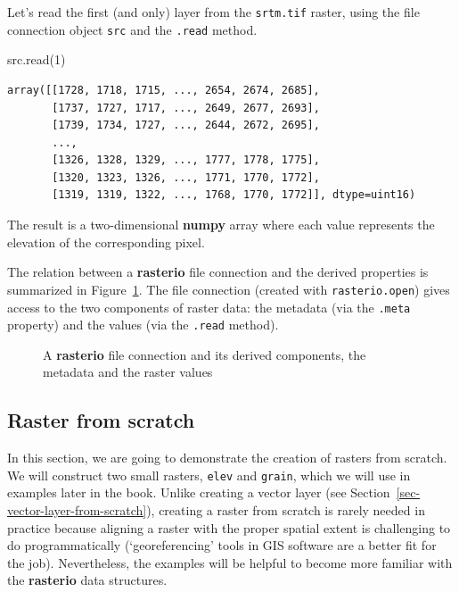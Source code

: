 \documentclass[
  letterpaper,
]{krantz}
\newenvironment{Shaded}{\begin{snugshade}}{\end{snugshade}}
\newcommand{\DecValTok}[1]{\textcolor[rgb]{0.68,0.00,0.00}{#1}}
\newcommand{\NormalTok}[1]{\textcolor[rgb]{0.00,0.23,0.31}{#1}}
\begin{document}
Let's read the first (and only) layer from the \texttt{srtm.tif} raster,
using the file connection object \texttt{src} and the \texttt{.read}
method.

\begin{Shaded}
\begin{Highlighting}[]
\NormalTok{src.read(}\DecValTok{1}\NormalTok{)}
\end{Highlighting}
\end{Shaded}

\begin{verbatim}
array([[1728, 1718, 1715, ..., 2654, 2674, 2685],
       [1737, 1727, 1717, ..., 2649, 2677, 2693],
       [1739, 1734, 1727, ..., 2644, 2672, 2695],
       ...,
       [1326, 1328, 1329, ..., 1777, 1778, 1775],
       [1320, 1323, 1326, ..., 1771, 1770, 1772],
       [1319, 1319, 1322, ..., 1768, 1770, 1772]], dtype=uint16)
\end{verbatim}

The result is a two-dimensional \textbf{numpy} array where each value
represents the elevation of the corresponding pixel.

The relation between a \textbf{rasterio} file connection and the derived
properties is summarized in Figure~\ref{fig-rasterio-structure}. The
file connection (created with \texttt{rasterio.open}) gives access to
the two components of raster data: the metadata (via the \texttt{.meta}
property) and the values (via the \texttt{.read} method).

\begin{figure}


\caption{\label{fig-rasterio-structure}A \textbf{rasterio} file
connection and its derived components, the metadata and the raster
values}

\end{figure}%

\subsection{Raster from scratch}\label{sec-raster-from-scratch}

In this section, we are going to demonstrate the creation of rasters
from scratch. We will construct two small rasters, \texttt{elev} and
\texttt{grain}, which we will use in examples later in the book. Unlike
creating a vector layer (see
Section~\ref{sec-vector-layer-from-scratch}), creating a raster from
scratch is rarely needed in practice because aligning a raster with the
proper spatial extent is challenging to do programmatically
(`georeferencing' tools in GIS software are a better fit for the job).
Nevertheless, the examples will be helpful to become more familiar with
the \textbf{rasterio} data structures.
\end{document}
